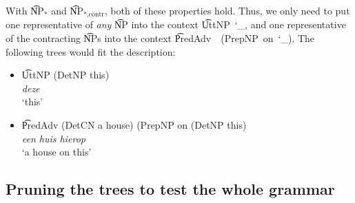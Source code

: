 \noindent With \t{NP$_*$} and \t{NP$_\text{*,contr}$}, both of these
properties hold.
Thus, we only need to put one representative of \emph{any} \t{NP} into
the context \t{UttNP~\char`_}, and one representative of the
contracting \t{NP}s into the context \t{PredAdv~~(PrepNP~on~\char`_)}. 
The following trees would fit the description:

\begin{itemize}
\item[] \t{UttNP (DetNP this)}  \\
 \emph{deze} \\
 `this'
\item[] \t{PredAdv (DetCN a house) (PrepNP on (DetNP this)}  \\
\emph{een huis hierop} \\
`a house on this'
\end{itemize}






\subsection{Pruning the trees to test the whole grammar}
\label{sec:pruning_all}


